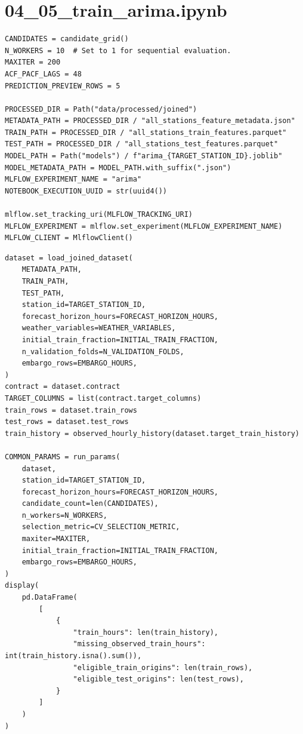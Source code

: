\section{04\_05\_train\_arima.ipynb}

\begin{verbatim}
CANDIDATES = candidate_grid()
N_WORKERS = 10  # Set to 1 for sequential evaluation.
MAXITER = 200
ACF_PACF_LAGS = 48
PREDICTION_PREVIEW_ROWS = 5

PROCESSED_DIR = Path("data/processed/joined")
METADATA_PATH = PROCESSED_DIR / "all_stations_feature_metadata.json"
TRAIN_PATH = PROCESSED_DIR / "all_stations_train_features.parquet"
TEST_PATH = PROCESSED_DIR / "all_stations_test_features.parquet"
MODEL_PATH = Path("models") / f"arima_{TARGET_STATION_ID}.joblib"
MODEL_METADATA_PATH = MODEL_PATH.with_suffix(".json")
MLFLOW_EXPERIMENT_NAME = "arima"
NOTEBOOK_EXECUTION_UUID = str(uuid4())

mlflow.set_tracking_uri(MLFLOW_TRACKING_URI)
MLFLOW_EXPERIMENT = mlflow.set_experiment(MLFLOW_EXPERIMENT_NAME)
MLFLOW_CLIENT = MlflowClient()
\end{verbatim}

\begin{verbatim}
dataset = load_joined_dataset(
    METADATA_PATH,
    TRAIN_PATH,
    TEST_PATH,
    station_id=TARGET_STATION_ID,
    forecast_horizon_hours=FORECAST_HORIZON_HOURS,
    weather_variables=WEATHER_VARIABLES,
    initial_train_fraction=INITIAL_TRAIN_FRACTION,
    n_validation_folds=N_VALIDATION_FOLDS,
    embargo_rows=EMBARGO_HOURS,
)
contract = dataset.contract
TARGET_COLUMNS = list(contract.target_columns)
train_rows = dataset.train_rows
test_rows = dataset.test_rows
train_history = observed_hourly_history(dataset.target_train_history)

COMMON_PARAMS = run_params(
    dataset,
    station_id=TARGET_STATION_ID,
    forecast_horizon_hours=FORECAST_HORIZON_HOURS,
    candidate_count=len(CANDIDATES),
    n_workers=N_WORKERS,
    selection_metric=CV_SELECTION_METRIC,
    maxiter=MAXITER,
    initial_train_fraction=INITIAL_TRAIN_FRACTION,
    embargo_rows=EMBARGO_HOURS,
)
display(
    pd.DataFrame(
        [
            {
                "train_hours": len(train_history),
                "missing_observed_train_hours": int(train_history.isna().sum()),
                "eligible_train_origins": len(train_rows),
                "eligible_test_origins": len(test_rows),
            }
        ]
    )
)
\end{verbatim}

